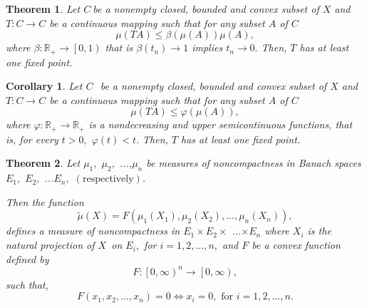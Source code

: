 \documentclass{amsart}
\newtheorem{theorem}{Theorem}
\theoremstyle{plain}
\newtheorem{corollary}{Corollary}
\numberwithin{equation}{section}
\begin{document}
\begin{theorem}
\cite{mursaleen} Let $C\ $be a nonempty closed, bounded and convex subset of 
$X$ and $T:C\rightarrow C$ be a continuous mapping such that for any subset $A$ of $C$\begin{equation*}
\mu \left( TA\right) \leqslant \beta \left( \mu \left( A\right) \right) \mu
\left( A\right) ,
\end{equation*}where $\beta :\mathbb{R}_{+}\rightarrow \left[ 0,1\right) $ that is $\beta
\left( t_{n}\right) \rightarrow 1$ implies $t_{n}\rightarrow 0.$ Then, $T$
has at least one fixed point.
\end{theorem}

\begin{corollary}
\label{fpth}\cite{mursaleen} Let $C\ $\ be a nonempty closed, bounded and
convex subset of $X$ and $T:C\rightarrow C$ be a continuous mapping such
that for any subset $A$ of $C$\begin{equation*}
\mu \left( TA\right) \leqslant \varphi \left( \mu \left( A\right) \right) ,
\end{equation*}where $\varphi :\mathbb{R}_{+}\rightarrow \mathbb{R}_{+}$ is a nondecreasing
and upper semicontinuous functions, that is, for every $t>0,$ $\varphi
\left( t\right) <t.$ Then, $T$ has at least one fixed point.
\end{corollary}

\begin{theorem}
\label{th copy}\cite{kamenski} Let $\mu _{1},$ $\mu _{2},$ ...,$\mu _{n}$ be
measures of noncompactness in Banach spaces $E_{1},$ $E_{2},$ ...$E_{n},$ $\left( \text{respectively}\right) $.

Then the function\begin{equation*}
\widetilde{\mu }\left( X\right) =F\left( \mu _{1}\left( X_{1}\right) ,\mu
_{2}\left( X_{2}\right) ,...,\mu _{n}\left( X_{n}\right) \right) ,
\end{equation*}defines a measure of noncompactness in $E_{1}\times E_{2}\times $ ...$\times
E_{n}$ where $X_{i}$ is the natural projection of $X$\ on $E_{i},$ for $i=1,2,...,n,$ and $F$ be a convex function defined by\begin{equation*}
F:\left[ 0,\infty \right) ^{n}\rightarrow \left[ 0,\infty \right) ,
\end{equation*}such that,\begin{equation*}
F\left( x_{1},x_{2},...,x_{n}\right) =0\Leftrightarrow x_{i}=0,\text{ for }i=1,2,...,n.
\end{equation*}
\end{theorem}
\end{document}
